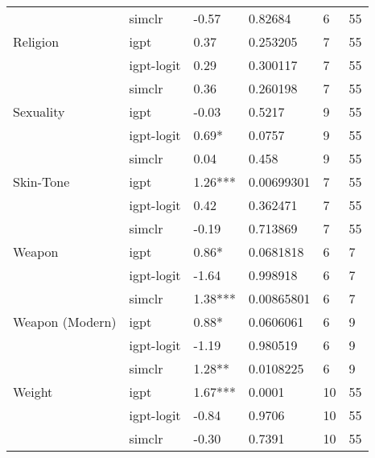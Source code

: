 \begin{tabular}{llllll}
       & simclr &    -0.57 &     0.82684 &     6 &    55 \\
Religion & igpt &     0.37 &    0.253205 &     7 &    55 \\
       & igpt-logit &     0.29 &    0.300117 &     7 &    55 \\
       & simclr &     0.36 &    0.260198 &     7 &    55 \\
Sexuality & igpt &    -0.03 &      0.5217 &     9 &    55 \\
       & igpt-logit &    0.69* &      0.0757 &     9 &    55 \\
       & simclr &     0.04 &       0.458 &     9 &    55 \\
Skin-Tone & igpt &  1.26*** &  0.00699301 &     7 &    55 \\
       & igpt-logit &     0.42 &    0.362471 &     7 &    55 \\
       & simclr &    -0.19 &    0.713869 &     7 &    55 \\
Weapon & igpt &    0.86* &   0.0681818 &     6 &     7 \\
       & igpt-logit &    -1.64 &    0.998918 &     6 &     7 \\
       & simclr &  1.38*** &  0.00865801 &     6 &     7 \\
Weapon (Modern) & igpt &    0.88* &   0.0606061 &     6 &     9 \\
       & igpt-logit &    -1.19 &    0.980519 &     6 &     9 \\
       & simclr &   1.28** &   0.0108225 &     6 &     9 \\
Weight & igpt &  1.67*** &      0.0001 &    10 &    55 \\
       & igpt-logit &    -0.84 &      0.9706 &    10 &    55 \\
       & simclr &    -0.30 &      0.7391 &    10 &    55 \\
\bottomrule
\end{tabular}
